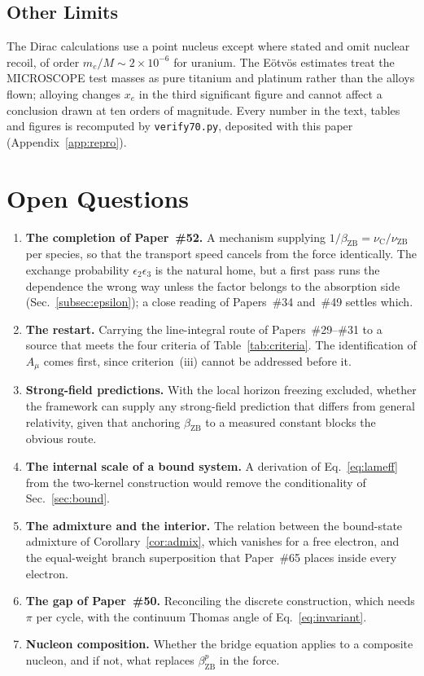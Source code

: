 \documentclass[%
 reprint, amsmath,amssymb, aps, prb, ]{revtex4-2}
\numberwithin{equation}{section}
\newcommand{\betaZB}{\beta_{\text{ZB}}}
\newcommand{\nuZB}{\nu_{\text{ZB}}}
\newcommand{\nuC}{\nu_{\text{C}}}
\begin{document}
\subsection{Other Limits}
\label{subsec:other_limits}

The Dirac calculations use a point nucleus except where stated and omit nuclear recoil, of order $m_e/M \sim 2\times10^{-6}$ for uranium. The E\"otv\"os estimates treat the MICROSCOPE test masses as pure titanium and platinum rather than the alloys flown; alloying changes $x_e$ in the third significant figure and cannot affect a conclusion drawn at ten orders of magnitude. Every number in the text, tables and figures is recomputed by \texttt{verify70.py}, deposited with this paper (Appendix~\ref{app:repro}).

\section{Open Questions}
\label{sec:open}

\begin{enumerate}[label=(\roman*),leftmargin=*]
\item \textbf{The completion of Paper~\#52.} A mechanism supplying $1/\betaZB = \nuC/\nuZB$ per species, so that the transport speed cancels from the force identically. The exchange probability $\epsilon_2\epsilon_3$ is the natural home, but a first pass runs the dependence the wrong way unless the factor belongs to the absorption side (Sec.~\ref{subsec:epsilon}); a close reading of Papers~\#34 and~\#49 settles which.
\item \textbf{The restart.} Carrying the line-integral route of Papers~\#29--\#31 to a source that meets the four criteria of Table~\ref{tab:criteria}. The identification of $A_\mu$ comes first, since criterion~(iii) cannot be addressed before it.
\item \textbf{Strong-field predictions.} With the local horizon freezing excluded, whether the framework can supply any strong-field prediction that differs from general relativity, given that anchoring $\betaZB$ to a measured constant blocks the obvious route.
\item \textbf{The internal scale of a bound system.} A derivation of Eq.~\eqref{eq:lameff} from the two-kernel construction would remove the conditionality of Sec.~\ref{sec:bound}.
\item \textbf{The admixture and the interior.} The relation between the bound-state admixture of Corollary~\ref{cor:admix}, which vanishes for a free electron, and the equal-weight branch superposition that Paper~\#65 places inside every electron.
\item \textbf{The gap of Paper~\#50.} Reconciling the discrete construction, which needs $\pi$ per cycle, with the continuum Thomas angle of Eq.~\eqref{eq:invariant}.
\item \textbf{Nucleon composition.} Whether the bridge equation applies to a composite nucleon, and if not, what replaces $\betaZB^{p}$ in the force.
\end{enumerate}
\end{document}
